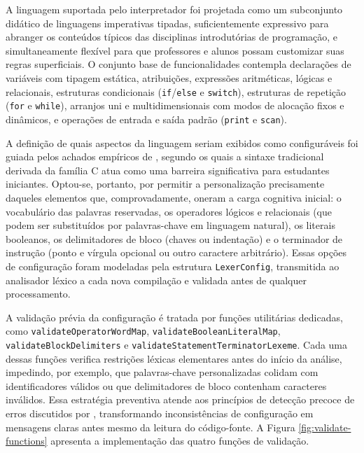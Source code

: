 A linguagem suportada pelo interpretador foi projetada como um subconjunto didático de linguagens imperativas tipadas, suficientemente expressivo para abranger os conteúdos típicos das disciplinas introdutórias de programação, e simultaneamente flexível para que professores e alunos possam customizar suas regras superficiais. O conjunto base de funcionalidades contempla declarações de variáveis com tipagem estática, atribuições, expressões aritméticas, lógicas e relacionais, estruturas condicionais (\texttt{if}/\texttt{else} e \texttt{switch}), estruturas de repetição (\texttt{for} e \texttt{while}), arranjos uni e multidimensionais com modos de alocação fixos e dinâmicos, e operações de entrada e saída padrão (\texttt{print} e \texttt{scan}).

A definição de quais aspectos da linguagem seriam exibidos como configuráveis foi guiada pelos achados empíricos de , segundo os quais a sintaxe tradicional derivada da família C atua como uma barreira significativa para estudantes iniciantes. Optou-se, portanto, por permitir a personalização precisamente daqueles elementos que, comprovadamente, oneram a carga cognitiva inicial: o vocabulário das palavras reservadas, os operadores lógicos e relacionais (que podem ser substituídos por palavras-chave em linguagem natural), os literais booleanos, os delimitadores de bloco (chaves ou indentação) e o terminador de instrução (ponto e vírgula opcional ou outro caractere arbitrário). Essas opções de configuração foram modeladas pela estrutura \texttt{LexerConfig}, transmitida ao analisador léxico a cada nova compilação e validada antes de qualquer processamento.

A validação prévia da configuração é tratada por funções utilitárias dedicadas, como \texttt{validateOperator}\allowbreak\texttt{WordMap}, \texttt{validateBoolean}\allowbreak\texttt{LiteralMap}, \texttt{validateBlock}\allowbreak\texttt{Delimiters} e \texttt{validateStatement}\allowbreak\texttt{TerminatorLexeme}. Cada uma dessas funções verifica restrições léxicas elementares antes do início da análise, impedindo, por exemplo, que palavras-chave personalizadas colidam com identificadores válidos ou que delimitadores de bloco contenham caracteres inválidos. Essa estratégia preventiva atende aos princípios de detecção precoce de erros discutidos por , transformando inconsistências de configuração em mensagens claras antes mesmo da leitura do código-fonte. A Figura \ref{fig:validate-functions} apresenta a implementação das quatro funções de validação.

